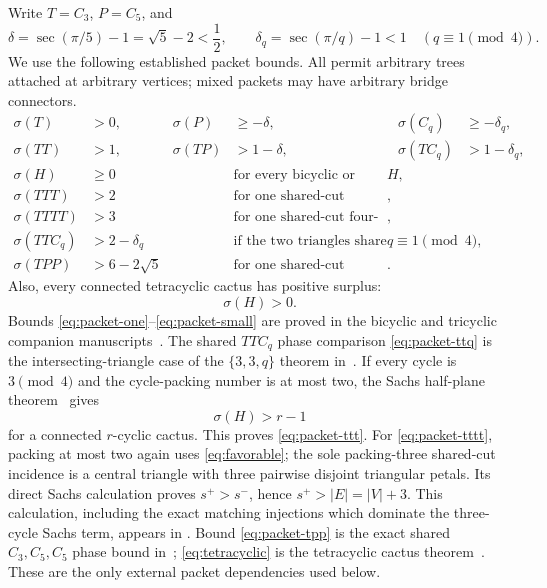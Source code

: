 \documentclass[11pt]{article}
\newcommand{\spE}{s^+}
\newcommand{\smE}{s^-}
\newcommand{\sig}{\sigma}
\begin{document}
Write $T=C_3$, $P=C_5$, and
\[
 \delta=\sec(\pi/5)-1=\sqrt5-2<\frac12,
 \qquad \delta_q=\sec(\pi/q)-1<1\quad(q\equiv1\pmod4).
\]
We use the following established packet bounds.  All permit arbitrary trees
attached at arbitrary vertices; mixed packets may have arbitrary bridge
connectors.
\begin{align}
 \sig(T)&>0,& \sig(P)&\geq-\delta,
   &\sig(C_q)&\geq-\delta_q,\label{eq:packet-one}\\
 \sig(TT)&>1,& \sig(TP)&>1-\delta,
   &\sig(TC_q)&>1-\delta_q,\label{eq:packet-two}\\
 \sig(H)&\geq0&&\text{for every bicyclic or tricyclic cactus }H,
   \label{eq:packet-small}\\
 \sig(TTT)&>2&&\text{for one shared-cut triangular cluster},
   \label{eq:packet-ttt}\\
 \sig(TTTT)&>3&&\text{for one shared-cut four-triangle cluster},
   \label{eq:packet-tttt}\\
 \sig(TTC_q)&>2-\delta_q
   &&\text{if the two triangles share a cut and }q\equiv1\pmod4,
   \label{eq:packet-ttq}\\
 \sig(TPP)&>6-2\sqrt5
   &&\text{for one shared-cut cluster}.\label{eq:packet-tpp}
\end{align}
Also, every connected tetracyclic cactus has positive surplus:
\begin{equation}\label{eq:tetracyclic}
 \sig(H)>0.
\end{equation}
Bounds \eqref{eq:packet-one}--\eqref{eq:packet-small} are proved in the
bicyclic and tricyclic companion manuscripts~\cite{Bicyclic,Tricyclic}.
The shared $TTC_q$ phase comparison \eqref{eq:packet-ttq} is the
intersecting-triangle case of the $\{3,3,q\}$ theorem in~\cite{Tricyclic}.
If every cycle is $3\pmod4$ and the cycle-packing number is at most two, the
Sachs half-plane theorem~\cite{PackingTwo} gives
\begin{equation}\label{eq:favorable}
 \sig(H)>r-1
\end{equation}
for a connected $r$-cyclic cactus.  This proves
\eqref{eq:packet-ttt}.  For \eqref{eq:packet-tttt}, packing at most two again
uses \eqref{eq:favorable}; the sole packing-three shared-cut incidence is a
central triangle with three pairwise disjoint triangular petals.  Its direct
Sachs calculation proves $\spE>\smE$, hence
$\spE>|E|=|V|+3$.  This calculation, including the exact matching injections
which dominate the three-cycle Sachs term, appears in
\cite[Proposition~4.11]{PackingTwo}.  Bound \eqref{eq:packet-tpp} is the exact
shared $C_3,C_5,C_5$ phase bound in~\cite{Tricyclic};
\eqref{eq:tetracyclic} is the tetracyclic cactus theorem~\cite{Tetracyclic}.
These are the only external packet dependencies used below.
\end{document}
